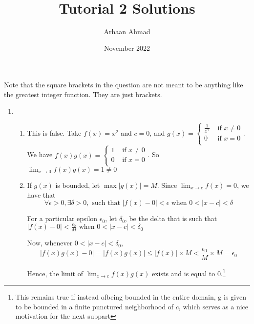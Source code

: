 \documentclass{article}
\title{Tutorial 2 Solutions}
\author{Arhaan Ahmad}
\date{November 2022}
\begin{document}
        \maketitle
                Note that the square brackets in the question are not meant to be anything like the greatest integer function. They are just brackets.
        \begin{enumerate}
                \item \begin{enumerate}
                        \item This is false. Take $f(x) = x^2$ and $c=0$, and 
                                $g(x) = \begin{cases}
                                        \frac{1}{x^2} & \text{ if } x \neq 0\\
                                        0 & \text{ if } x = 0\\
                                \end{cases}$. 
                                We have 
                                $f(x)g(x) = \begin{cases}
                                        1 & \text{ if } x \neq 0\\
                                        0 & \text{ if } x = 0\\
                                \end{cases}$. 
                                So $\lim_{x\to 0} f(x)g(x) = 1 \neq 0$
                         \item If $g(x)$ is bounded, let $\max |g(x)| = M$. 
                                 Since $\lim_{x\to c} f(x) = 0$, we have that 
                                 $$\forall \epsilon > 0, \exists \delta > 0, \text{ such that } |f(x) - 0 | < \epsilon \text{ when } 0 < |x-c| < \delta$$


                                 For a particular epsilon $\epsilon_0$, let $\delta_0$, be the delta that is such that 
                                 $|f(x) - 0 | < \frac{\epsilon_0}{M} \text{ when } 0 < |x-c| < \delta_0$

                                 Now, whenever $0 < |x-c| < \delta_0$, 
                                 $$|f(x)g(x) - 0| = |f(x)g(x)| \leq |f(x)| \times M < \frac{\epsilon_0}{M} \times M = \epsilon_0$$
                                 
                                 Hence, the limit of $\lim_{x\to c}f(x)g(x)$ exists and is equal to $0$.\footnote{This remains true if instead ofbeing bounded in the entire domain, g is given to be bounded in a finite punctured neighborhood of $c$, which serves as a nice motivation for the next subpart} 
 

\end{enumerate}
\end{enumerate}
\end{document}
